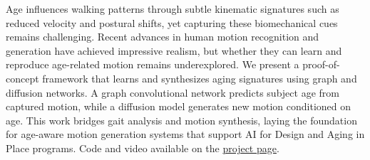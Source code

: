 Age influences walking patterns through subtle kinematic signatures such as reduced velocity and postural shifts, yet capturing these biomechanical cues remains challenging. Recent advances in human motion recognition and generation have achieved impressive realism, but whether they can learn and reproduce age-related motion remains underexplored. We present a proof-of-concept framework that learns and synthesizes aging signatures using graph and diffusion networks. A graph convolutional network predicts subject age from captured motion, while a diffusion model generates new motion conditioned on age. This work bridges gait analysis and motion synthesis, laying the foundation for age-aware motion generation systems that support AI for Design and Aging in Place programs. Code and video available on the \href{https://catr1xliu.github.io/Notebook/Aging-Motion-Project/}{project page}.